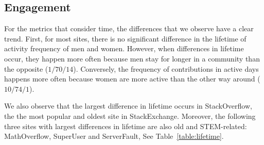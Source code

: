 


\subsection{Engagement}%
For the metrics that consider time, the differences that we observe have a clear trend. First, for most sites, there is no significant difference in the lifetime of activity frequency of men and women. However, when differences in lifetime occur, they happen more often because men stay for longer in a community than the opposite ($1/70/14$). Conversely, the frequency of contributions in active days happens more often because women are more active than the other way around ($10/74/1$). 

We also observe that the largest difference in lifetime occurs in StackOverflow, the the most popular and oldest site in StackExchange. Moreover, the following three sites with largest differences in lifetime are also old and STEM-related: MathOverflow, SuperUser and ServerFault, See Table~\ref{table:lifetime}. 

